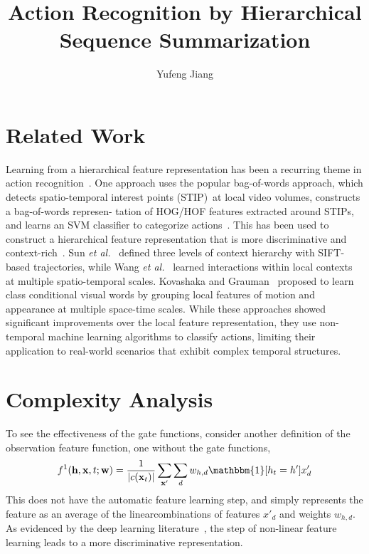 \documentclass[10pt,twocolumn,letterpaper]{article}
\begin{document}
\title{Action Recognition by Hierarchical Sequence Summarization}
\author{Yufeng Jiang}
\maketitle

\section{Related Work}

Learning from a hierarchical feature representation has been a recurring theme in action recognition~\cite{model,spatio,hierarchy}. One approach uses the popular bag-of-words approach, which detects spatio-temporal interest points (STIP)~\cite{On}at local video volumes, constructs a bag-of-words represen- tation of HOG/HOF features extracted around STIPs, and learns an SVM classifier to categorize actions~\cite{realistic}. This has been used to construct a hierarchical feature representation that is more discriminative and context-rich~\cite{spatio,hierarchy}. Sun \emph{et al.}~\cite{spatio} defined three levels of context hierarchy with SIFT-based trajectories, while Wang \emph{et al.}~\cite{recognition} learned interactions within local contexts at multiple spatio-temporal scales. Kovashaka and Grauman~\cite{hierarchy} proposed to learn class conditional visual words by grouping local features of motion and appearance at multiple space-time scales. While these approaches showed significant improvements over the local feature representation, they use non-temporal machine learning algorithms to classify actions, limiting their application to real-world scenarios that exhibit complex temporal structures.

\section{Complexity Analysis}

To see the effectiveness of the gate functions, consider another definition of the observation feature function, one without the gate functions,\\
\begin{gather}
f^1(\mathbf{h},\mathbf{x},t;\mathbf{w}) = \frac{1}{|c(\mathbf{x}_t)|}\sum_{\mathbf{x'}}\sum_{d}w_{h,d}\mathbbm{1}[h_t = h']x'_d
\end{gather}
This does not have the automatic feature learning step, and simply represents the feature as an average of the linearcombinations of features $x'_d$ and weights $w_{h,d}$. As evidenced by the deep learning literature~\cite{Learning}, the step of non-linear feature learning leads to a more discriminative representation.
\end{document}

